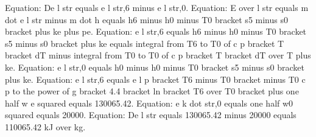 Equation: De l str equals e l str,6 minus e l str,0.
Equation: E over l str equals m dot e l str minus m dot h equals h6 minus h0 minus T0 bracket s5 minus s0 bracket plus ke plus pe.
Equation: e l str,6 equals h6 minus h0 minus T0 bracket s5 minus s0 bracket plus ke equals integral from T6 to T0 of c p bracket T bracket dT minus integral from T0 to T0 of c p bracket T bracket dT over T plus ke.
Equation: e l str,0 equals h0 minus h0 minus T0 bracket s5 minus s0 bracket plus ke.
Equation: e l str,6 equals e l p bracket T6 minus T0 bracket minus T0 c p to the power of g bracket 4.4 bracket ln bracket T6 over T0 bracket plus one half w e squared equals 130065.42.
Equation: e k dot str,0 equals one half w0 squared equals 20000.
Equation: De l str equals 130065.42 minus 20000 equals 110065.42 kJ over kg.